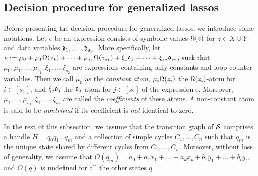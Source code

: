 \subsection{Decision procedure for generalized lassos}\label{sec-glasso}
%
Before presenting the decision procedure for generalized lassos, we introduce some notations.
Let $e$ be an expression consists of symbolic values $\Omega(z)$ for $z\in X\cup Y$ and data variables $\mathfrak{d}_1, \dots, \mathfrak{d}_{s_2}$. More specifically, let $e:=\mu_0 + \mu_1 \Omega(z_1) +\dots + \mu_{s_1} \Omega(z_{s_1}) + \xi_1 \mathfrak{d}_1 + \dots + \xi_{s_2} \mathfrak{d}_{s_2}$,
such that $\mu_0,\mu_1,\dots,\mu_{s_1}, \xi_1,\dots,\xi_{s_2}$ are expressions containing only constants and loop counter variables.
Then we call $\mu_0$ as the \emph{constant atom}, $\mu_i \Omega(z_i)$ the $\Omega(z_i)$-atom for $i\in[s_1]$, and $\xi_j \mathfrak{d}_j$ the $\mathfrak{d}_j$-atom for $j\in[s_2]$ of the expression $e$. Moreover, $\mu_1, \dots, \mu_{s_1}, \xi_1,\dots, \xi_{s_2}$ are called the \emph{coefficients} of these atoms. A non-constant atom is said to be \emph{nontrivial} if its coefficient is \emph{not} identical to zero.

In the rest of this subsection, we assume that the transition graph of ${\mathcal{S} }$ comprises a handle $H=q_0 q_1 \dots q_m$ and a collection of simple cycles $C_1,\dots,C_n$ such that $q_m$ is the unique state shared by different cycles from $C_1,\dots,C_n$. Moreover, without loss of generality, we assume that $O(q_m) = a_0 + a_1 x_1 + \dots + a_k x_k + b_1 y_1 + \dots + b_l y_l$, and $O(q)$ is undefined for all the other states $q$.


